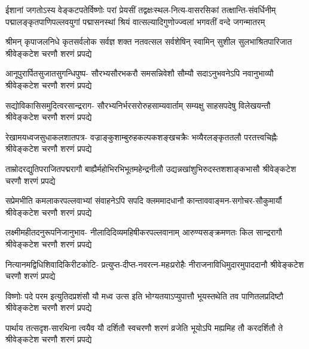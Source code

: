 
\fourlineindentedshloka
{ईशानां जगतोऽस्य वेङ्कटपतेर्विष्णोः परां प्रेयसीं}
{तद्वक्षःस्थल-नित्य-वासरसिकां तत्क्षान्ति-संवर्धिनीम्}
{पद्मालङ्कृतपाणिपल्लवयुगां पद्मासनस्थां श्रियं}
{वात्सल्यादिगुणोज्ज्वलां भगवतीं वन्दे जगन्मातरम्}

\begin{AutoCols}[\maxColumns]
\adjustShlokaSpaceSkip

\fourlineindentedshloka
{श्रीमन् कृपाजलनिधे कृतसर्वलोक}
{सर्वज्ञ शक्त नतवत्सल सर्वशेषिन्}
{स्वामिन् सुशील सुलभाश्रितपारिजात}
{श्रीवेङ्कटेश चरणौ शरणं प्रपद्ये}

\fourlineindentedshloka
{आनूपुरार्पितसुजातसुगन्धिपुष्प-}
{सौरभ्यसौरभकरौ समसन्निवेशौ}
{सौम्यौ सदाऽनुभवनेऽपि नवानुभाव्यौ}
{श्रीवेङ्कटेश चरणौ शरणं प्रपद्ये}

\fourlineindentedshloka
{सद्योविकासिसमुदित्वरसान्द्रराग-}
{सौरभ्यनिर्भरसरोरुहसाम्यवार्ताम्}
{सम्यक्षु साहसपदेषु विलेखयन्तौ}
{श्रीवेङ्कटेश चरणौ शरणं प्रपद्ये}

\fourlineindentedshloka
{रेखामयध्वजसुधाकलशातपत्र-}
{वज्राङ्कुशाम्बुरुहकल्पकशङ्खचक्रैः}
{भव्यैरलङ्कृततलौ परतत्त्वचिह्नैः}
{श्रीवेङ्कटेश चरणौ शरणं प्रपद्ये}

\fourlineindentedshloka
{ताम्रोदरद्युतिपराजितपद्मरागौ}
{बाह्यैर्महोभिरभिभूतमहेन्द्रनीलौ}
{उद्यन्नखांशुभिरुदस्तशशाङ्कभासौ}
{श्रीवेङ्कटेश चरणौ शरणं प्रपद्ये}

\fourlineindentedshloka
{सप्रेमभीति कमलाकरपल्लवाभ्यां}
{संवाहनेऽपि सपदि क्लममादधानौ}
{कान्ताववाङ्मन-सगोचर-सौकुमार्यौ}
{श्रीवेङ्कटेश चरणौ शरणं प्रपद्ये}

\fourlineindentedshloka
{लक्ष्मीमहीतदनुरूपनिजानुभाव-}
{नीलादिदिव्यमहिषीकरपल्लवानाम्}
{आरुण्यसङ्क्रमणतः किल सान्द्ररागौ}
{श्रीवेङ्कटेश चरणौ शरणं प्रपद्ये}

\fourlineindentedshloka
{नित्यानमद्विधिशिवादिकिरीटकोटि-}
{प्रत्युप्त-दीप्त-नवरत्न-महःप्ररोहैः}
{नीराजनाविधिमुदारमुपाददानौ}
{श्रीवेङ्कटेश चरणौ शरणं प्रपद्ये}

\fourlineindentedshloka
{विष्णोः पदे परम इत्युतिदप्रशंसौ}
{यौ मध्व उत्स इति भोग्यतयाऽप्युपात्तौ}
{भूयस्तथेति तव पाणितलप्रदिष्टौ}
{श्रीवेङ्कटेश चरणौ शरणं प्रपद्ये}

\fourlineindentedshloka
{पार्थाय तत्सदृश-सारथिना त्वयैव}
{यौ दर्शितौ स्वचरणौ शरणं व्रजेति}
{भूयोऽपि मह्यमिह तौ करदर्शितौ ते}
{श्रीवेङ्कटेश चरणौ शरणं प्रपद्ये}


\end{AutoCols}
